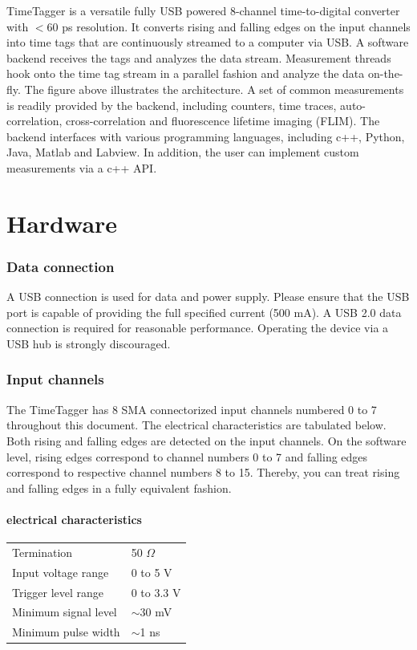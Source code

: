 \documentclass[oneside]{memoir}
\begin{document}

TimeTagger is a versatile fully USB powered 8-channel time-to-digital converter
with $<$60 ps resolution. It converts rising and falling edges on
the input channels into time tags that are continuously streamed
to a computer via USB. A software backend receives the tags and
analyzes the data stream. Measurement threads hook onto
the time tag stream in a parallel fashion
and analyze the data on-the-fly. The figure above illustrates the architecture.
A set of common measurements is readily provided by the backend, including
counters, time traces, auto-correlation, cross-correlation and fluorescence lifetime
imaging (FLIM). The backend interfaces with various programming
languages, including c++, Python, Java, Matlab and Labview. In addition, the
user can implement custom measurements via a c++ API.

\chapter{Hardware}

\subsection{Data connection}

A USB connection is used for data and power supply. Please ensure that the USB port is capable of providing the full
specified current (500 mA). A USB 2.0 data connection is required for reasonable performance. Operating the device via
a USB hub is strongly discouraged.

\subsection{Input channels}

The TimeTagger has 8 SMA connectorized input channels numbered 0 to 7 throughout this document. The electrical
characteristics are tabulated below. Both rising and falling edges are detected on the input channels.
On the software level, rising edges correspond to channel numbers 0 to 7 and falling edges correspond to
respective channel numbers 8 to 15. Thereby, you can treat rising and falling edges in a fully equivalent fashion.
\subsubsection{electrical characteristics}
\begin{tabular}{ll}
  Termination & 50 $\Omega$\\
  Input voltage range & 0 to 5 V\\
  Trigger level range & 0 to 3.3 V\\
  Minimum signal level & $\sim$30 mV\\
  Minimum pulse width & $\sim$1 ns\\
\end{tabular}
\end{document}
